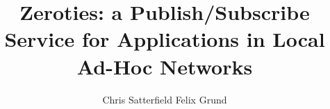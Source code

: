 \documentclass[sigconf]{acmart}
\title{Zeroties: a Publish/Subscribe Service for Applications in Local Ad-Hoc Networks}
\author{Chris Satterfield \qquad Felix Grund}
\affiliation{
    \institution{University of British Columbia}
    \city{Vancouver} 
    \state{BC} 
  }
\begin{document}
\begin{abstract}

\end{abstract}

\maketitle



















\end{document}
